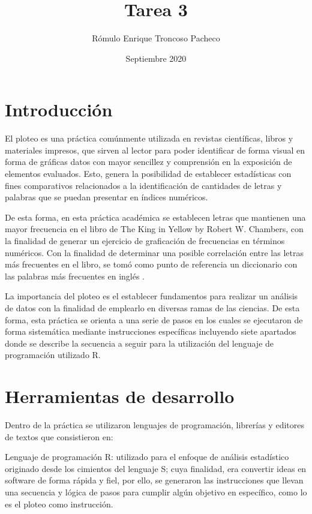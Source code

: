 \documentclass{article}
\title{Tarea 3}
\author{Rómulo Enrique Troncoso Pacheco}
\date{Septiembre 2020}
\begin{document}
\maketitle

\section{Introducción}
El ploteo es una práctica comúnmente utilizada en revistas científicas, libros y materiales impresos, que sirven al lector para poder identificar de forma visual en forma de gráficas datos con mayor sencillez y comprensión en la exposición de elementos evaluados. Esto, genera la posibilidad de establecer estadísticas con fines comparativos relacionados a la identificación de cantidades  de letras y palabras que se puedan presentar en índices numéricos.

De esta forma, en esta práctica académica se establecen letras que mantienen una mayor frecuencia en el libro de The King in Yellow by Robert W. Chambers\cite{The_King_in_Yellow}, con la finalidad de generar un ejercicio de graficación de frecuencias en términos numéricos.
Con la finalidad de determinar una posible correlación entre las letras más frecuentes en el libro, se tomó como punto de referencia un diccionario con las palabras más frecuentes en inglés \cite{diccionario}. 

La importancia del ploteo es el establecer fundamentos para realizar un análisis de datos con la finalidad de emplearlo en diversas ramas de las ciencias. De esta forma, esta práctica se orienta a una serie de pasos en los cuales se ejecutaron de forma sistemática mediante instrucciones específicas incluyendo siete apartados donde se describe la secuencia a seguir para la utilización del lenguaje de programación utilizado R\cite{r}.

\section{Herramientas de desarrollo}
Dentro de la práctica se utilizaron lenguajes de programación, librerías y editores de textos que consistieron en:

Lenguaje de programación R\cite{r}: utilizado para el enfoque de análisis estadístico originado desde los cimientos del lenguaje S; cuya finalidad, era convertir ideas en software de forma rápida y fiel, por ello, se generaron las instrucciones que llevan una secuencia y lógica de pasos para cumplir algún objetivo en específico, como lo es el ploteo como instrucción.
\end{document}

